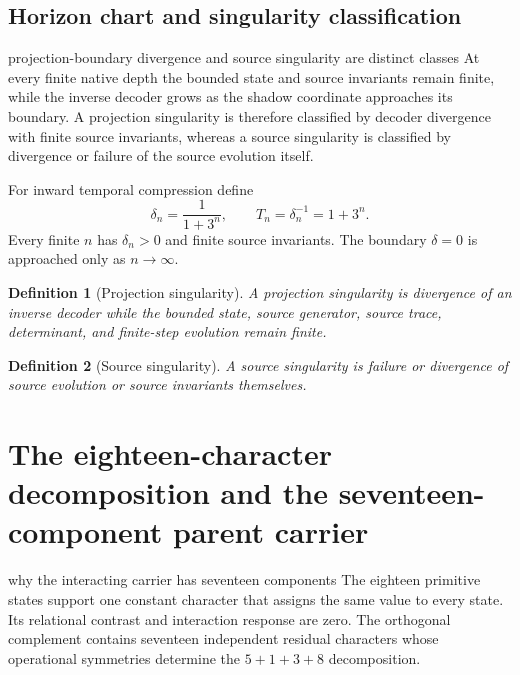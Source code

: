 \documentclass[11pt]{article}
\numberwithin{equation}{section}
\newtheorem{definition}{Definition}[section]
\theoremstyle{remark}
\begin{document}
\subsection{Horizon chart and singularity classification}
\begin{interpretivebridge}{projection-boundary divergence and source singularity are distinct classes}
At every finite native depth the bounded state and source invariants remain finite, while the inverse decoder grows as the shadow coordinate approaches its boundary. A projection singularity is therefore classified by decoder divergence with finite source invariants, whereas a source singularity is classified by divergence or failure of the source evolution itself.
\end{interpretivebridge}

For inward temporal compression define
\begin{equation}
\delta_n=\frac1{1+3^n},\qquad T_n=\delta_n^{-1}=1+3^n.
\end{equation}
Every finite $n$ has $\delta_n>0$ and finite source invariants. The boundary $\delta=0$ is approached only as $n\to\infty$.

\begin{definition}[Projection singularity]
A projection singularity is divergence of an inverse decoder while the bounded state, source generator, source trace, determinant, and finite-step evolution remain finite.
\end{definition}

\begin{definition}[Source singularity]
A source singularity is failure or divergence of source evolution or source invariants themselves.
\end{definition}

\section{The eighteen-character decomposition and the seventeen-component parent carrier}
\begin{conceptledger}{why the interacting carrier has seventeen components}
The eighteen primitive states support one constant character that assigns the same value to every state. Its relational contrast and interaction response are zero. The orthogonal complement contains seventeen independent residual characters whose operational symmetries determine the $5+1+3+8$ decomposition.
\end{conceptledger}
\end{document}
